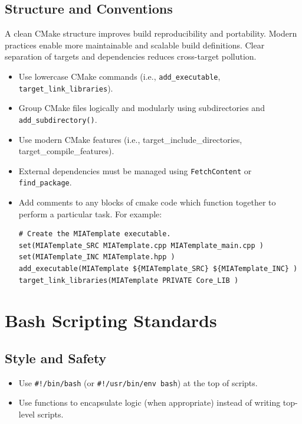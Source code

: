 \subsection{Structure and Conventions}
A clean CMake structure improves build reproducibility and portability. Modern practices enable more maintainable and scalable build definitions. Clear separation of targets and dependencies reduces cross-target pollution.
\begin{itemize}\itemsep0em
    \item Use lowercase CMake commands (i.e., \texttt{add\_executable}, \texttt{target\_link\_libraries}).
    \item Group CMake files logically and modularly using subdirectories and \texttt{add\_subdirectory()}.
    \item Use modern CMake features (i.e., target\_include\_directories, target\_compile\_features).
    \item External dependencies must be managed using \texttt{FetchContent} or \texttt{find\_package}.
    \item Add comments to any blocks of cmake code which function together to perform a particular task. For example:
    \begin{lstlisting}[style=pythonstyle]
# Create the MIATemplate executable.
set(MIATemplate_SRC MIATemplate.cpp MIATemplate_main.cpp )
set(MIATemplate_INC MIATemplate.hpp )
add_executable(MIATemplate ${MIATemplate_SRC} ${MIATemplate_INC} )
target_link_libraries(MIATemplate PRIVATE Core_LIB )
    \end{lstlisting}
\end{itemize}











\section{Bash Scripting Standards}

\subsection{Style and Safety}
\begin{itemize}\itemsep0em
    \item Use \texttt{\#!/bin/bash} (or \texttt{\#!/usr/bin/env bash}) at the top of scripts.
    \item Use functions to encapsulate logic (when appropriate) instead of writing top-level scripts.
\end{itemize}

